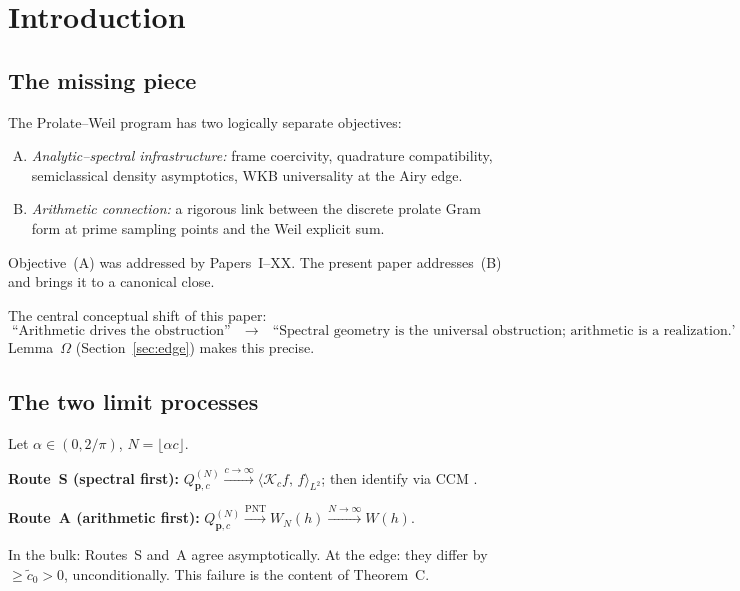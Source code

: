 \documentclass[12pt,a4paper]{amsart}
\theoremstyle{definition}
\newcommand{\Kop}{\mathcal{K}_c}
\newcommand{\QM}{Q^{(N)}_{\mathbf{p},c}}
\newcommand{\ip}[2]{\langle #1,\, #2\rangle}
\begin{document}
\tableofcontents

\section{Introduction}\label{sec:intro}

\subsection{The missing piece}

The Prolate--Weil program has two logically separate objectives:
\begin{enumerate}[(A)]
  \item \emph{Analytic--spectral infrastructure:}
  frame coercivity, quadrature compatibility, semiclassical
  density asymptotics, WKB universality at the Airy edge.
  \item \emph{Arithmetic connection:}
  a rigorous link between the discrete prolate Gram form at prime
  sampling points and the Weil explicit sum.
\end{enumerate}
Objective~(A) was addressed by Papers~I--XX. The present paper
addresses~(B) and brings it to a canonical close.

The central conceptual shift of this paper:
\[
  \text{``Arithmetic drives the obstruction''}
  \quad\longrightarrow\quad
  \text{``Spectral geometry is the universal obstruction;
  arithmetic is a realization.'}
\]
Lemma~$\Omega$ (Section~\ref{sec:edge}) makes this precise.

\subsection{The two limit processes}

Let $\alpha \in (0, 2/\pi)$, $N = \lfloor \alpha c \rfloor$.

\medskip
\noindent \textbf{Route~S (spectral first):}
$\QM \xrightarrow{c \to \infty} \ip{\Kop f}{f}_{L^2}$;
then identify via CCM \cite{CCM2025,CCM_PNAS2022}.

\medskip
\noindent \textbf{Route~A (arithmetic first):}
$\QM \xrightarrow{\mathrm{PNT}} W_N(h) \xrightarrow{N\to\infty} W(h)$.

\medskip
In the bulk: Routes~S and~A agree asymptotically.
At the edge: they differ by $\ge \tilde c_0 > 0$, unconditionally.
This failure is the content of Theorem~C.
\end{document}
